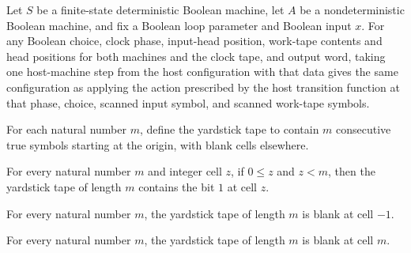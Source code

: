 \begin{theorem}
\label{Turing.ClockHost.stepWith_hostCfg}
\leanok
{}
Let $S$ be a finite-state deterministic Boolean machine, let $A$ be a nondeterministic
Boolean machine, and fix a Boolean loop parameter and Boolean input $x$. For any Boolean
choice, clock phase, input-head position, work-tape contents and head positions for both
machines and the clock tape, and output word, taking one host-machine step from the host
configuration with that data gives the same configuration as applying the action
prescribed by the host transition function at that phase, choice, scanned input symbol,
and scanned work-tape symbols.
\end{theorem}

\begin{definition}
\label{Turing.ClockHost.yard}
\leanok
{}
For each natural number $m$, define the yardstick tape to contain $m$ consecutive true
symbols starting at the origin, with blank cells elsewhere.
\end{definition}

\begin{theorem}
\label{Turing.ClockHost.yard_of_lt}
\leanok
{}
For every natural number $m$ and integer cell $z$, if $0 \le z$ and $z < m$, then the
yardstick tape of length $m$ contains the bit $1$ at cell $z$.
\end{theorem}

\begin{theorem}
\label{Turing.ClockHost.yard_neg_one}
\leanok
{}
For every natural number $m$, the yardstick tape of length $m$ is blank at cell $-1$.
\end{theorem}

\begin{theorem}
\label{Turing.ClockHost.yard_len}
\leanok
{}
For every natural number $m$, the yardstick tape of length $m$ is blank at cell $m$.
\end{theorem}

